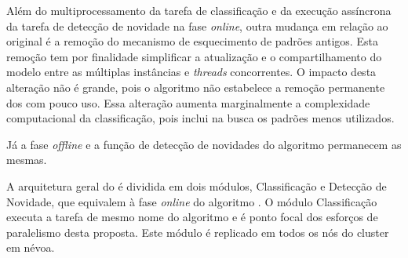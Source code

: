 Além do multiprocessamento da tarefa de classificação e da execução assíncrona da
tarefa de detecção de novidade na fase \emph{online}, outra mudança em relação
ao \minas original é a remoção do mecanismo de esquecimento de padrões antigos.
Esta remoção tem por finalidade simplificar a atualização e o compartilhamento
do modelo entre as múltiplas instâncias e \emph{threads} concorrentes.
% 
O impacto desta alteração não é grande, pois o algoritmo \minas não estabelece a remoção
permanente dos \mclusters com pouco uso. Essa alteração aumenta marginalmente 
a complexidade computacional da classificação, pois inclui na busca  os padrões menos utilizados.

Já a fase \emph{offline} e a função de detecção de novidades do algoritmo \minas
permanecem as mesmas.



A arquitetura geral do \mfog é dividida em dois módulos, Classificação e
Detecção de Novidade, que equivalem à fase \emph{online} do algoritmo \minas.
O módulo Classificação executa a tarefa de mesmo nome do algoritmo \minas e é
ponto focal dos esforços de paralelismo desta proposta.
Este módulo é replicado em todos os nós do cluster %
em névoa.

